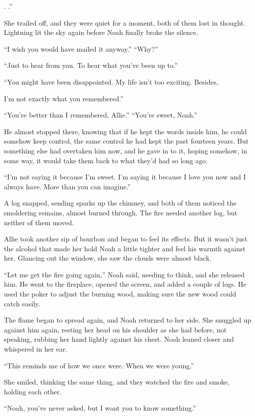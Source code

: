 \documentclass[10pt, twoside, openright]{book}
\begin{document}
. .''

She trailed off, and they were quiet for a moment, both of them lost in
thought. Lightning lit the sky again before Noah finally broke the
silence.


``I wish you would have mailed it anyway.'' ``Why?''

``Just to hear from you. To hear what you've been up to.''

``You might have been disappointed. My life isn't too exciting. Besides,


I'm not exactly what you remembered.''


``You're better than I remembered, Allie.'' ``You're sweet, Noah.''


He almost stopped there, knowing that if he kept the words inside him,
he could somehow keep control, the same control he had kept the past
fourteen years. But something else had overtaken him now, and he gave in
to it, hoping somehow, in some way, it would take them back to what
they'd had so long ago.

``I'm not saying it because I'm sweet. I'm saying it because I love you
now and I always have. More than you can imagine.''

A log snapped, sending sparks up the chimney, and both of them noticed
the smoldering remains, almost burned through. The fire needed another
log, but neither of them moved.

Allie took another sip of bourbon and began to feel its effects. But it
wasn't just the alcohol that made her hold Noah a little tighter and
feel his warmth against her. Glancing out the window, she saw the clouds
were almost black.

``Let me get the fire going again,'' Noah said, needing to think, and
she released him. He went to the fireplace, opened the screen, and added
a couple of logs. He used the poker to adjust the burning wood, making
sure the new wood could catch easily.

The flame began to spread again, and Noah returned to her side. She
snuggled up against him again, resting her head on his shoulder as she
had before, not speaking, rubbing her hand lightly against his chest.
Noah leaned closer and whispered in her ear.


``This reminds me of how we once were. When we were young.''


She smiled, thinking the same thing, and they watched the fire and
smoke, holding each other.


``Noah, you've never asked, but I want you to know something.''
\end{document}
